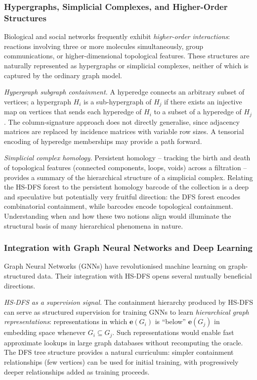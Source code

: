 ﻿\documentclass[12pt,a4paper]{article}
\theoremstyle{plain}
\theoremstyle{definition}
\theoremstyle{remark}
\begin{document}
	\subsubsection*{Hypergraphs, Simplicial Complexes, and Higher-Order Structures}

	Biological and social networks frequently exhibit \emph{higher-order
	interactions}: reactions involving three or more molecules simultaneously,
	group communications, or higher-dimensional topological features.  These
	structures are naturally represented as hypergraphs or simplicial complexes,
	neither of which is captured by the ordinary graph model.

	\emph{Hypergraph subgraph containment.}  A hyperedge connects an arbitrary
	subset of vertices; a hypergraph $H_i$ is a sub-hypergraph of $H_j$ if
	there exists an injective map on vertices that sends each hyperedge of
	$H_i$ to a subset of a hyperedge of $H_j$.  The column-signature approach
	does not directly generalise, since adjacency matrices are replaced by
	incidence matrices with variable row sizes.  A tensorial encoding of
	hyperedge memberships may provide a path forward.

	\emph{Simplicial complex homology.}  Persistent homology -- tracking the
	birth and death of topological features (connected components, loops,
	voids) across a filtration -- provides a summary of the hierarchical
	structure of a simplicial complex.  Relating the HS-DFS forest to the
	persistent homology barcode of the collection is a deep and speculative
	but potentially very fruitful direction: the DFS forest encodes
	combinatorial containment, while barcodes encode topological containment.
	Understanding when and how these two notions align would illuminate the
	structural basis of many hierarchical phenomena in nature.

	\subsubsection*{Integration with Graph Neural Networks and Deep Learning}

	Graph Neural Networks (GNNs) have revolutionised machine learning on
	graph-structured data.  Their integration with HS-DFS opens several
	mutually beneficial directions.

	\emph{HS-DFS as a supervision signal.}  The containment hierarchy produced
	by HS-DFS can serve as structured supervision for training GNNs to learn
	\emph{hierarchical graph representations}: representations in which
	$\mathbf{e}(G_i)$ is ``below'' $\mathbf{e}(G_j)$ in embedding space
	whenever $G_i \subseteq G_j$.  Such representations would enable fast
	approximate lookups in large graph databases without recomputing the oracle.
	The DFS tree structure provides a natural curriculum: simpler containment
	relationships (few vertices) can be used for initial training, with
	progressively deeper relationships added as training proceeds.
\end{document}
